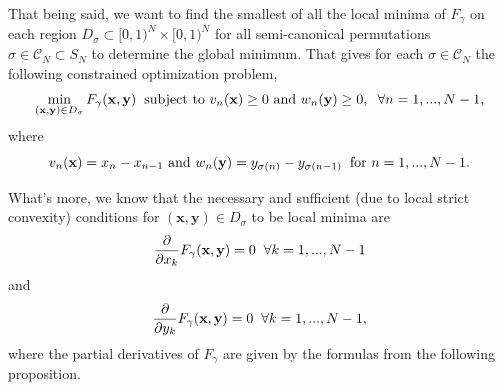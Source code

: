 That being said, we want to find the smallest of all the local minima of $F_{\gamma}$ on each region $D_{\sigma} \subset [0,1)^N\times [0,1)^N$ for all semi-canonical permutations $\sigma \in \mathcal{C}_N \subset S_N$ to determine the global minimum. That gives for each $\sigma \in \mathcal{C}_N$ the following constrained optimization problem,
\begin{equation*}
    \min_{(\textbf{x},\textbf{y}) \in D_{\sigma}}{F_\gamma (\textbf{x},\textbf{y})} \hspace{2mm} \text{subject to } v_n(\textbf{x}) \geq 0 \text{ and } w_n(\textbf{y}) \geq 0, \hspace{2mm} \forall n=1,...,N-1,
\end{equation*}
where 
\begin{equation*}
    v_n(\textbf{x}) = x_n-x_{n-1} \text{ and } w_n(\textbf{y}) = y_{\sigma(n)} - y_{\sigma(n-1)} \hspace{2mm} \text{for } n=1,...,N-1.
\end{equation*}

What's more, we know that the necessary and sufficient (due to local strict convexity) conditions for $(\textbf{x},\textbf{y})\in D_{\sigma}$ to be local minima are
\begin{equation*}
    \frac{\partial}{\partial x_k}F_{\gamma}(\textbf{x},\textbf{y}) = 0 \hspace{2mm} \forall k=1,...,N-1
\end{equation*}
and
\begin{equation*}
    \frac{\partial}{\partial y_k}F_{\gamma}(\textbf{x},\textbf{y}) = 0 \hspace{2mm} \forall k=1,...,N-1,
\end{equation*}
where the partial derivatives of $F_{\gamma}$ are given by the formulas from the following proposition.\\

